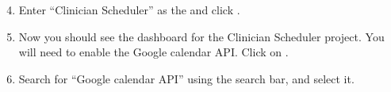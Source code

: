 \documentclass[letterpaper,10pt,english]{sphinxmanual}
\begin{document}
\begin{figure}[htbp]
\centering
{}\end{figure}

\begin{DUlineblock}{0em}
\item[] 
\end{DUlineblock}
\begin{enumerate}
\setcounter{enumi}{3}
\item {} 
Enter “Clinician Scheduler” as the  and click .

\end{enumerate}

\begin{figure}[htbp]
\centering
{}\end{figure}

\begin{DUlineblock}{0em}
\item[] 
\end{DUlineblock}
\begin{enumerate}
\setcounter{enumi}{4}
\item {} 
Now you should see the dashboard for the Clinician Scheduler project.
You will need to enable the Google calendar API. Click on .

\end{enumerate}

\begin{figure}[htbp]
\centering
{}\end{figure}

\begin{DUlineblock}{0em}
\item[] 
\end{DUlineblock}
\begin{enumerate}
\setcounter{enumi}{5}
\item {} 
Search for “Google calendar API” using the search bar, and select it.

\end{enumerate}

\begin{figure}[htbp]
\centering
{}\end{figure}
\end{document}
